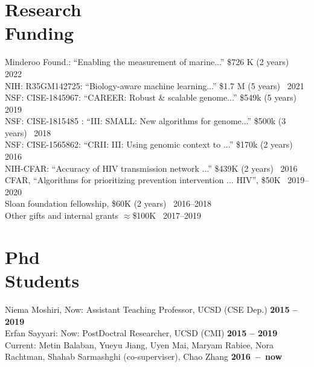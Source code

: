 \documentclass[margin,line,letterpaper]{resume}
\begin{document}
\begin{resume}
    \section{\mysidestyle Research\\Funding}
     Minderoo Found.: ``Enabling the measurement of marine...''  \$726 K (2 years)~
 \hfill 2022\\
          NIH: R35GM142725:  ``Biology-aware machine learning...''
 \$1.7 M (5 years)~
  \hfill 2021\\
      NSF: CISE-1845967:  ``CAREER: Robust \& scalable genome...''
 \$549k (5 years)~
 \hfill 2019\\
      NSF: CISE-1815485 :  ``III: SMALL: New algorithms for genome...''
 \$500k (3 years)~
 \hfill 2018\\
 NSF: CISE-1565862:  ``CRII: III: Using genomic context to ...''
 \$170k (2 years)~
 \hfill 2016\\
 NIH-CFAR:  ``Accuracy of HIV transmission network ...''
 \$439K (2 years)~
 \hfill 2016\\
 CFAR, ``Algorithms for prioritizing prevention intervention ... HIV'', \$50K \hfill  ~2019--2020\\
  Sloan foundation fellowship, \$60K (2 years) \hfill  ~2016--2018\\
 Other gifts and internal grants $\approx$\$100K  \hfill  ~2017--2019



\section{\mysidestyle Phd \\Students}
    Niema Moshiri, Now: Assistant Teaching Professor, UCSD (CSE Dep.)
 \hfill \textbf{2015 -- 2019}\\
     Erfan Sayyari:  Now: PostDoctral Researcher, UCSD (CMI)
 \hfill \textbf{2015 -- 2019}\\
Current: Metin Balaban, Yueyu Jiang, Uyen Mai, Maryam Rabiee, Nora Rachtman, Shahab Sarmashghi (co-superviser), Chao Zhang \hfill \textbf{2016~--~now}




\end{resume}
\end{document}
